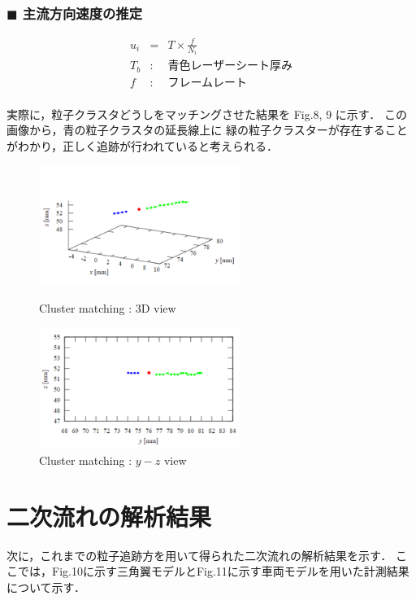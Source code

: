 \documentclass[twocolumn,a4j]{jsarticle}
\begin{document}
\subsubsection*{$\blacksquare$ 主流方向速度の推定}
\begin{eqnarray*}
	u_i &=& T \times \frac{f}{N_i}\\
	T_b &:& \text{青色レーザーシート厚み} \\
	f &:& \text{フレームレート}\\
\end{eqnarray*}

\newpage
実際に，粒子クラスタどうしをマッチングさせた結果を Fig.8, 9 に示す．
この画像から，青の粒子クラスタの延長線上に
緑の粒子クラスターが存在することがわかり，正しく追跡が行われていると考えられる．

\begin{figure}[htbp]
	\centering
	\includegraphics[keepaspectratio, width=65mm]{../images/cluster_matching_1.png}
	\caption{Cluster matching : 3D view}
	\includegraphics[keepaspectratio, width=65mm]{../images/cluster_matching_2.png}
	\caption{Cluster matching : $y-z$ view}
\end{figure}

\section{二次流れの解析結果}
次に，これまでの粒子追跡方を用いて得られた二次流れの解析結果を示す．
ここでは，Fig.10に示す三角翼モデルとFig.11に示す車両モデルを用いた計測結果について示す．\\
\end{document}
